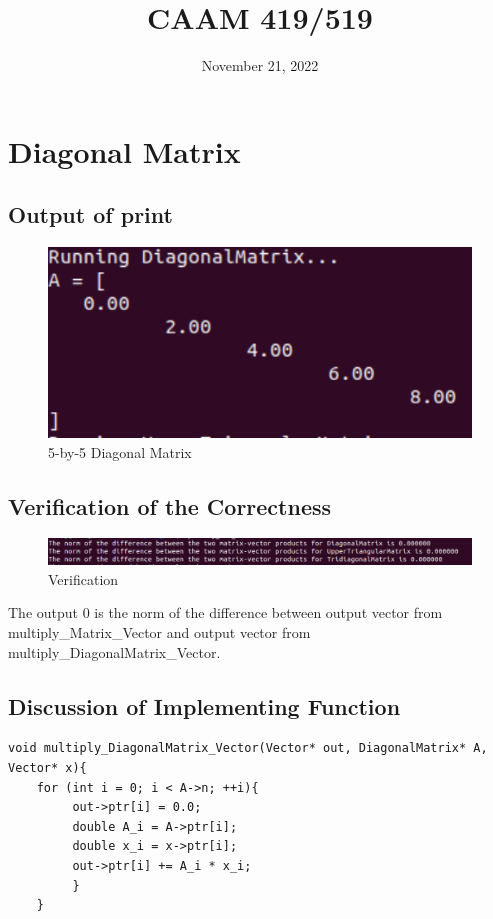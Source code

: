 \documentclass[10pt,a4paper]{article}
\title{CAAM 419/519}
\date{November 21, 2022}
\begin{document}
\maketitle

\section{Diagonal Matrix}
\subsection{Output of print}

\begin{figure}[!ht]
        \centering \includegraphics[scale=1]{figures/diagonalmatrix print.png}
        \caption{5-by-5 Diagonal Matrix}
\end{figure}

\subsection{Verification of the Correctness}

\begin{figure}[!ht]
        \centering \includegraphics[scale=0.8]{figures/verification.png}
        \caption{Verification}
\end{figure}

The output 0 is the norm of the difference between output vector from multiply\_Matrix\_Vector and output vector from multiply\_DiagonalMatrix\_Vector.

\subsection{Discussion of Implementing Function}

\begin{lstlisting}[]
void multiply_DiagonalMatrix_Vector(Vector* out, DiagonalMatrix* A, Vector* x){  
    for (int i = 0; i < A->n; ++i){    
         out->ptr[i] = 0.0;    
         double A_i = A->ptr[i];    
         double x_i = x->ptr[i];    
         out->ptr[i] += A_i * x_i;  
         }
    }
\end{lstlisting}
\end{document}
